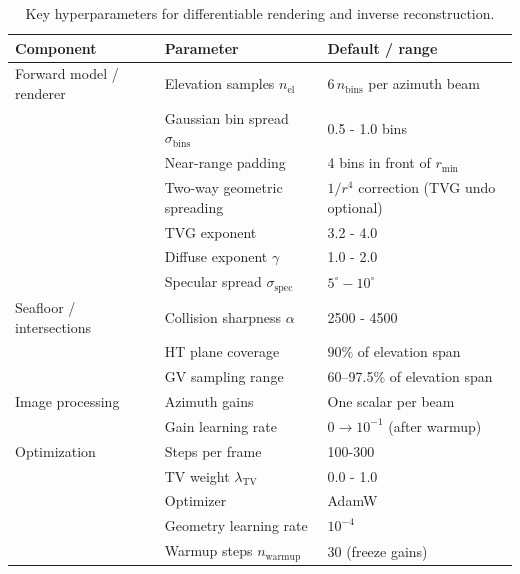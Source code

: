 \begin{table}[t]
    \centering
    \caption{\centering
        Key hyperparameters for differentiable rendering and inverse reconstruction.}
    \label{tab:hyperparams}
    \begin{tabular}{@{}lll@{}}
        \toprule
        Component & Parameter & Default / range \\
        \midrule
        Forward model / renderer
        & Elevation samples \(n_\mathrm{el}\) &
            \(6\,n_\mathrm{bins}\) per azimuth beam \\
        & Gaussian bin spread \(\sigma_\mathrm{bins}\) &
            \num{0.5} - \num{1.0} bins \\
        & Near-range padding &
            4 bins in front of \(r_\mathrm{min}\) \\
        & Two-way geometric spreading &
            \(1/r^4\) correction (TVG undo optional) \\
        & TVG exponent &
            \num{3.2} - \num{4.0} \\
        & Diffuse exponent \(\gamma\) &
            \num{1.0} - \num{2.0} \\
        & Specular spread \(\sigma_\mathrm{spec}\) &
            \(5^\circ - 10^\circ\) \\
        \midrule
        Seafloor / intersections
        & Collision sharpness \(\alpha\) &
            \num{2500} - \num{4500} \\
        & HT plane coverage &
            \(90\%\) of elevation span \\
        & GV sampling range &
            60–97.5\% of elevation span \\
        \midrule
        Image processing
        & Azimuth gains &
            One scalar per beam \\
        & Gain learning rate &
            \(0 \rightarrow 10^{-1}\) (after warmup) \\
        \midrule
        Optimization
        & Steps per frame &
            \num{100}-\num{300} \\
        & TV weight \(\lambda_\mathrm{TV}\) &
            \num{0.0} - \num{1.0} \\
        & Optimizer &
            AdamW \\
        & Geometry learning rate &
            \(10^{-4}\) \\
        & Warmup steps \(n_\mathrm{warmup}\) &
            \num{30} (freeze gains) \\
        \bottomrule
    \end{tabular}
\end{table}

